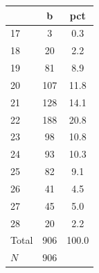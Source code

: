 {
\def\sym#1{\ifmmode^{#1}\else\(^{#1}\)\fi}
\begin{tabular}{l*{1}{cc}}
\toprule
            &           b&         pct\\
\midrule
17          &           3&         0.3\\
18          &          20&         2.2\\
19          &          81&         8.9\\
20          &         107&        11.8\\
21          &         128&        14.1\\
22          &         188&        20.8\\
23          &          98&        10.8\\
24          &          93&        10.3\\
25          &          82&         9.1\\
26          &          41&         4.5\\
27          &          45&         5.0\\
28          &          20&         2.2\\
Total       &         906&       100.0\\
\midrule
\(N\)       &         906&            \\
\bottomrule
\end{tabular}
}
